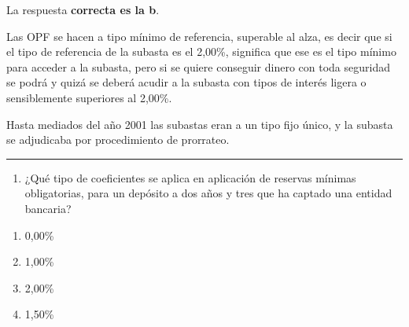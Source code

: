\documentclass[
  letterpaper,
  DIV=11,
  numbers=noendperiod]{scrreprt}
\providecommand{\tightlist}{%
  \setlength{\itemsep}{0pt}\setlength{\parskip}{0pt}}\usepackage{longtable,booktabs,array}
\begin{document}
\begin{tcolorbox}[enhanced jigsaw, left=2mm, opacityback=0, colback=white, breakable, arc=.35mm, bottomrule=.15mm, rightrule=.15mm, toprule=.15mm, leftrule=.75mm, colframe=quarto-callout-tip-color-frame]
\begin{minipage}[t]{5.5mm}
\textcolor{quarto-callout-tip-color}{\faLightbulb}
\end{minipage}%
\begin{minipage}[t]{\textwidth - 5.5mm}

La respuesta \textbf{correcta es la b}.

Las OPF se hacen a tipo mínimo de referencia, superable al alza, es
decir que si el tipo de referencia de la subasta es el 2,00\%, significa
que ese es el tipo mínimo para acceder a la subasta, pero si se quiere
conseguir dinero con toda seguridad se podrá y quizá se deberá acudir a
la subasta con tipos de interés ligera o sensiblemente superiores al
2,00\%.

Hasta mediados del año 2001 las subastas eran a un tipo fijo único, y la
subasta se adjudicaba por procedimiento de prorrateo.

\end{minipage}%
\end{tcolorbox}

\begin{center}\rule{0.5\linewidth}{0.5pt}\end{center}

\begin{enumerate}
\def\labelenumi{\arabic{enumi}.}
\setcounter{enumi}{39}
\tightlist
\item
  ¿Qué tipo de coeficientes se aplica en aplicación de reservas mínimas
  obligatorias, para un depósito a dos años y tres que ha captado una
  entidad bancaria?
\end{enumerate}

\begin{enumerate}
\def\labelenumi{\alph{enumi})}
\item
  0,00\%
\item
  1,00\%
\item
  2,00\%
\item
  1,50\%
\end{enumerate}
\end{document}
